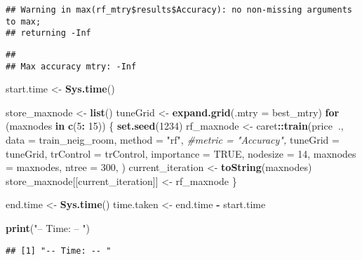 \documentclass[
]{article}
\newenvironment{Shaded}{\begin{snugshade}}{\end{snugshade}}
\newcommand{\CommentTok}[1]{\textcolor[rgb]{0.56,0.35,0.01}{\textit{#1}}}
\newcommand{\ControlFlowTok}[1]{\textcolor[rgb]{0.13,0.29,0.53}{\textbf{#1}}}
\newcommand{\DataTypeTok}[1]{\textcolor[rgb]{0.13,0.29,0.53}{#1}}
\newcommand{\DecValTok}[1]{\textcolor[rgb]{0.00,0.00,0.81}{#1}}
\newcommand{\KeywordTok}[1]{\textcolor[rgb]{0.13,0.29,0.53}{\textbf{#1}}}
\newcommand{\NormalTok}[1]{#1}
\newcommand{\OperatorTok}[1]{\textcolor[rgb]{0.81,0.36,0.00}{\textbf{#1}}}
\newcommand{\OtherTok}[1]{\textcolor[rgb]{0.56,0.35,0.01}{#1}}
\newcommand{\StringTok}[1]{\textcolor[rgb]{0.31,0.60,0.02}{#1}}
\begin{document}
\begin{verbatim}
## Warning in max(rf_mtry$results$Accuracy): no non-missing arguments to max;
## returning -Inf
\end{verbatim}

\begin{verbatim}
## 
## Max accuracy mtry: -Inf
\end{verbatim}

\begin{Shaded}
\begin{Highlighting}[]
\NormalTok{start.time <-}\StringTok{ }\KeywordTok{Sys.time}\NormalTok{()}

\NormalTok{store_maxnode <-}\StringTok{ }\KeywordTok{list}\NormalTok{()}
\NormalTok{tuneGrid <-}\StringTok{ }\KeywordTok{expand.grid}\NormalTok{(}\DataTypeTok{.mtry =}\NormalTok{ best_mtry)}
\ControlFlowTok{for}\NormalTok{ (maxnodes }\ControlFlowTok{in} \KeywordTok{c}\NormalTok{(}\DecValTok{5}\OperatorTok{:}\StringTok{ }\DecValTok{15}\NormalTok{)) \{}
  \KeywordTok{set.seed}\NormalTok{(}\DecValTok{1234}\NormalTok{)}
\NormalTok{  rf_maxnode <-}\StringTok{ }\NormalTok{caret}\OperatorTok{::}\KeywordTok{train}\NormalTok{(price}\OperatorTok{~}\NormalTok{.,}
                      \DataTypeTok{data =}\NormalTok{ train_neig_room,}
                      \DataTypeTok{method =} \StringTok{"rf"}\NormalTok{,}
                      \CommentTok{#metric = "Accuracy",}
                      \DataTypeTok{tuneGrid =}\NormalTok{ tuneGrid,}
                      \DataTypeTok{trControl =}\NormalTok{ trControl,}
                      \DataTypeTok{importance =} \OtherTok{TRUE}\NormalTok{,}
                      \DataTypeTok{nodesize =} \DecValTok{14}\NormalTok{,}
                      \DataTypeTok{maxnodes =}\NormalTok{ maxnodes,}
                      \DataTypeTok{ntree =} \DecValTok{300}\NormalTok{,}
\NormalTok{  )}
\NormalTok{  current_iteration <-}\StringTok{ }\KeywordTok{toString}\NormalTok{(maxnodes)}
\NormalTok{  store_maxnode[[current_iteration]] <-}\StringTok{ }\NormalTok{rf_maxnode}
\NormalTok{\}}

\NormalTok{end.time <-}\StringTok{ }\KeywordTok{Sys.time}\NormalTok{()}
\NormalTok{time.taken <-}\StringTok{ }\NormalTok{end.time }\OperatorTok{-}\StringTok{ }\NormalTok{start.time}

\KeywordTok{print}\NormalTok{(}\StringTok{"-- Time: -- "}\NormalTok{)}
\end{Highlighting}
\end{Shaded}

\begin{verbatim}
## [1] "-- Time: -- "
\end{verbatim}
\end{document}
